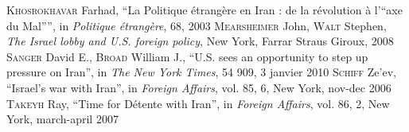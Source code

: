 \documentclass[
paper=a4,
fontsize=10pt,
headsepline,
headings=normal,
version=last,
footinclude=true,
mpinclude=true,
fleqn
]{scrartcl}
\begin{document}
\newpage
\begin{thebibliography}{5}
\textsc{Khosrokhavar} Farhad, \textquotedblleft La Politique étrangère en Iran : de la révolution à l'\textquotedblleft axe du Mal\textquotedblright\textquotedblright, in \emph{Politique étrangère}, 68, 2003
\textsc{Mearsheimer} John, \textsc{Walt} Stephen, \emph{The Israel lobby and U.S. foreign policy}, New York, Farrar Straus Giroux, 2008
\textsc{Sanger} David E., \textsc{Broad} William J., \textquotedblleft U.S. sees an opportunity to step up pressure on Iran\textquotedblright, in \emph{The New York Times}, 54 909, 3 janvier 2010
\textsc{Schiff} Ze'ev, \textquotedblleft Israel's war with Iran\textquotedblright, in \emph{Foreign Affairs}, vol. 85, 6, New York, nov-dec 2006
\textsc{Takeyh} Ray, \textquotedblleft Time for Détente with Iran\textquotedblright, in \emph{Foreign Affairs}, vol. 86, 2, New York, march-april 2007
\end{thebibliography}


% 
\end{document}
